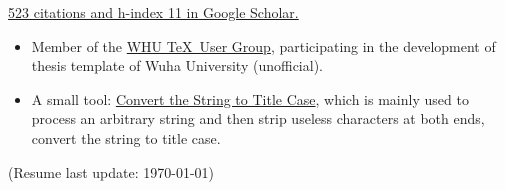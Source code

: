 \documentclass[10pt,a4paper,academicons]{altacv}
\begin{document}

\href{https://scholar.google.com/citations?user=i2LNBfUAAAAJ}{523 citations and h-index 11 in Google Scholar.}


\begin{itemize}
  \item Member of the \href{https://github.com/whutug}{WHU \TeX~User Group},
    participating in the development of thesis template of Wuha University (unofficial).
  \item A small tool: \href{https://title-case.github.io/}{Convert
    the String to Title Case},
    which is mainly used to process an arbitrary string and then strip
    useless characters at both ends, convert the string to title case.
\end{itemize}

(Resume last update: \today)
\end{document}
